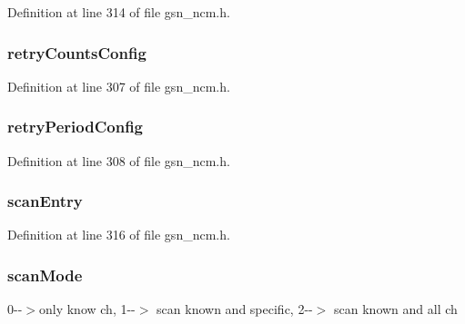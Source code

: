 Definition at line 314 of file gsn\_\-ncm.h.

\hypertarget{a00157_a7ddd9f43be1859c0966e7190ed9587a1}{
\subsubsection[{retryCountsConfig}]{ {\bf retryCountsConfig}}}
\label{a00157_a7ddd9f43be1859c0966e7190ed9587a1}


Definition at line 307 of file gsn\_\-ncm.h.

\hypertarget{a00157_ade18e0608856c6310d7545a5bdcaff73}{
\subsubsection[{retryPeriodConfig}]{ {\bf retryPeriodConfig}}}
\label{a00157_ade18e0608856c6310d7545a5bdcaff73}


Definition at line 308 of file gsn\_\-ncm.h.

\hypertarget{a00157_a91f968e9f2c8a0efa427266de24e8c54}{
\subsubsection[{scanEntry}]{ {\bf scanEntry}}}
\label{a00157_a91f968e9f2c8a0efa427266de24e8c54}


Definition at line 316 of file gsn\_\-ncm.h.

\hypertarget{a00157_aae6d393064c283ee078d3402e32c1237}{
\subsubsection[{scanMode}]{ {\bf scanMode}}}
\label{a00157_aae6d393064c283ee078d3402e32c1237}
0-\/-\/$>$only know ch, 1-\/-\/$>$ scan known and specific, 2-\/-\/$>$ scan known and all ch 

